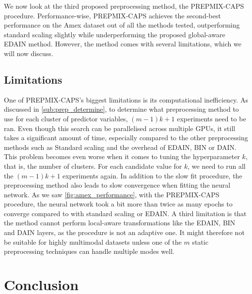 \documentclass{statsmsc}
\begin{document}
{We now look at the third proposed preprocessing method, the \ac{PREPMIX-CAPS} procedure.
Performance-wise, \ac{PREPMIX-CAPS} achieves the second-best performance on the Amex dataset
out of all the methods tested, outperforming standard scaling slightly while underperforming the
proposed global-aware \ac{EDAIN} method. However, the method comes with several limitations, which
we will now discuss.

\subsection{Limitations}%
\label{sub:Limitations}

One of \ac{PREPMIX-CAPS}'s biggest limitations is its computational
inefficiency. As discussed in \cref{sub:prep_determine}, to determine what
preprocessing method to use for each cluster of predictor variables, $(m-1)k+1$
experiments need to be ran. Even though this search can be parallelised across
multiple \acp{GPU}, it still takes a significant amount of time, especially
compared to the other preprocessing methods such as Standard scaling and the
overhead of \ac{EDAIN}, \ac{BIN} or \ac{DAIN}. This problem becomes even worse
when it comes to tuning the hyperparameter $k$, that is, the number of
clusters. For each candidate value for $k$, we need to run all the $(m-1)k+1$
experiments again.  In addition to the slow fit procedure, the preprocessing
method also leads to slow convergence when fitting the neural network.  As we
saw \cref{fig:amex_performance}, with the \ac{PREPMIX-CAPS} procedure, the
neural network took a bit more than twice as many epochs to converge compared
to with standard scaling or \ac{EDAIN}.  A third limitation is that the method
cannot perform local-aware transformations like the \ac{EDAIN}, \ac{BIN} and
\ac{DAIN} layers, as the procedure is not an adaptive one. It might therefore
not be suitable for highly multimodal datasets unless one of the $m$ static
preprocessing techniques can handle multiple modes well.



\section{Conclusion}%
\label{sec:Conclusion} %

}
\end{document}
